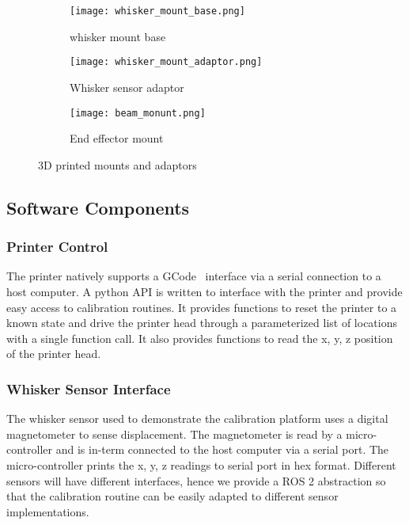 \documentclass[runningheads]{llncs}
\begin{document}
\begin{figure}
    \begin{subfigure}{.32\textwidth}
    \centering
    \texttt{[image: whisker\_mount\_base.png]}
        \caption{whisker mount base}
        \label{fig:whisker_mount_base}
    \end{subfigure}
    \begin{subfigure}{.32\textwidth}
        \centering
        \texttt{[image: whisker\_mount\_adaptor.png]}
        \caption{Whisker sensor adaptor}
        \label{fig:whisker_mount_adaptor}
    \end{subfigure}
    \begin{subfigure}{.32\textwidth}
        \centering
        \texttt{[image: beam\_monunt.png]}
        \caption{End effector mount}
        \label{fig:beam_monunt}
    \end{subfigure}
    \caption{3D printed mounts and adaptors}
    \label{fig:calibration_rig}
\end{figure}

\subsection{Software Components}

\subsubsection{Printer Control}

The printer natively supports a GCode~\cite{kramerNISTRS274NGCInterpreter2000} interface via a serial connection to a host computer. A python API is written to interface with the printer and provide easy access to calibration routines. It provides functions to reset the printer to a known state and drive the printer head through a parameterized list of locations with a single function call. It also provides functions to read the x, y, z position of the printer head.

\subsubsection{Whisker Sensor Interface}

The whisker sensor used to demonstrate the calibration platform uses a digital magnetometer to sense displacement. The magnetometer is read by a micro-controller and is in-term connected to the host computer via a serial port. The micro-controller prints the x, y, z readings to serial port in hex format. Different sensors will have different interfaces, hence we provide a ROS 2 abstraction so that the calibration routine can be easily adapted to different sensor implementations.
\end{document}
